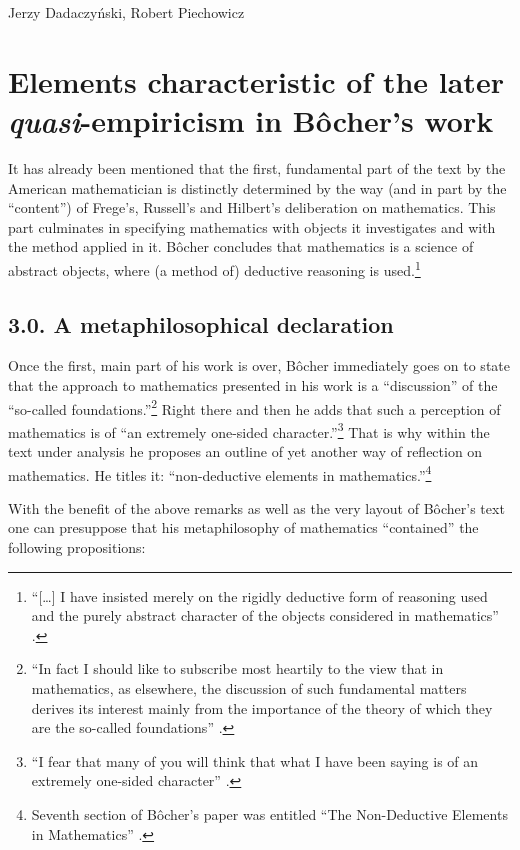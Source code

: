 \begin{artengenv}{Jerzy Dadaczyński, Robert Piechowicz}
\section{Elements characteristic of the later \textit{quasi}-empiricism in Bôcher's work}
It has already been mentioned that the first, fundamental part of the text by the American mathematician is distinctly determined by the way (and in part by the ``content'') of Frege's, Russell's and Hilbert's deliberation on mathematics. This part culminates in specifying mathematics with objects it investigates and with the method applied in it. Bôcher concludes that mathematics is a science of abstract objects, where (a method of) deductive reasoning is used.\footnote{``[…] I have insisted merely on the rigidly deductive form of reasoning used and the purely abstract character of the objects considered in mathematics''
\parencite[][p.132]{bocher_fundamental_1904}.%
}

\subsection{3.0. A metaphilosophical declaration}

Once the first, main part of his work is over, Bôcher immediately goes on to state that the approach to mathematics presented in his work is a ``discussion'' of the ``so-called foundations.''\footnote{``In fact I should like to subscribe most heartily to the view that in mathematics, as elsewhere, the discussion of such fundamental matters derives its interest mainly from the importance of the theory of which they are the so-called foundations''
\parencite[][pp.132–133]{bocher_fundamental_1904}.%
} Right there and then he adds that such a perception of mathematics is of ``an extremely one-sided character.''\footnote{``I fear that many of you will think that what I have been saying is of an extremely one-sided character'' 
\parencite[][p.132]{bocher_fundamental_1904}.%
} That is why within the text under analysis he proposes an outline of yet another way of reflection on mathematics. He titles it: ``non-deductive elements in mathematics.''\footnote{Seventh section of Bôcher's paper was entitled ``The Non-Deductive Elements in Mathematics'' 
\parencite[][p.132]{bocher_fundamental_1904}.%
}

With the benefit of the above remarks as well as the very layout of Bôcher's text one can presuppose that his metaphilosophy of mathematics ``contained'' the following propositions:


\end{artengenv}
